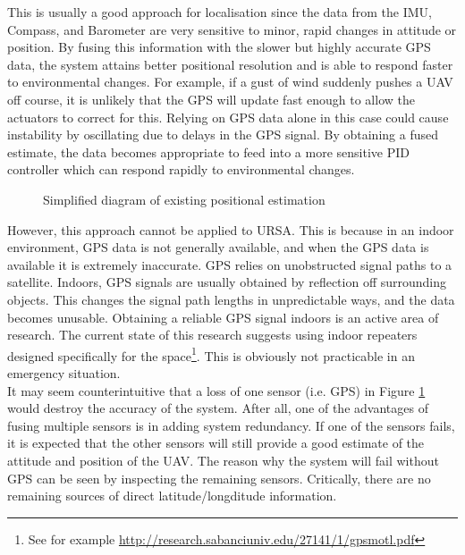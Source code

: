 \documentclass[capstone_report.tex]{subfiles}
\begin{document}
This is usually a good approach for localisation since the data from the IMU, Compass, and Barometer are very sensitive to minor, rapid changes in attitude or position. By fusing this information with the slower but highly accurate GPS data, the system attains better positional resolution and is able to respond faster to environmental changes. For example, if a gust of wind suddenly pushes a UAV off course, it is unlikely that the GPS will update fast enough to allow the actuators to correct for this. Relying on GPS data alone in this case could cause instability by oscillating due to delays in the GPS signal. By obtaining a fused estimate, the data becomes appropriate to feed into a more sensitive PID controller which can respond rapidly to environmental changes.

\begin{figure}[H]
	
	\caption{Simplified diagram of existing positional estimation\label{fig:estAlg2}}
\end{figure}

However, this approach cannot be applied to URSA. This is because in an indoor environment, GPS data is not generally available, and when the GPS data is available it is extremely inaccurate. GPS relies on unobstructed signal paths to a satellite. Indoors, GPS signals are usually obtained by reflection off surrounding objects. This changes the signal path lengths in unpredictable ways, and the data becomes unusable. Obtaining a reliable GPS signal indoors is an active area of research. The current state of this research suggests using indoor repeaters designed specifically for the space\footnote{See for example \url{http://research.sabanciuniv.edu/27141/1/gpsmotl.pdf}}. This is obviously not practicable in an emergency situation. \\

It may seem counterintuitive that a loss of one sensor (i.e. GPS) in Figure \ref{fig:estAlg2} would destroy the accuracy of the system. After all, one of the advantages of fusing multiple sensors is in adding system redundancy. If one of the sensors fails, it is expected that the other sensors will still provide a good estimate of the attitude and position of the UAV. The reason why the system will fail without GPS can be seen by inspecting the remaining sensors. Critically, there are no remaining sources of direct latitude/longditude information. \\
\end{document}
